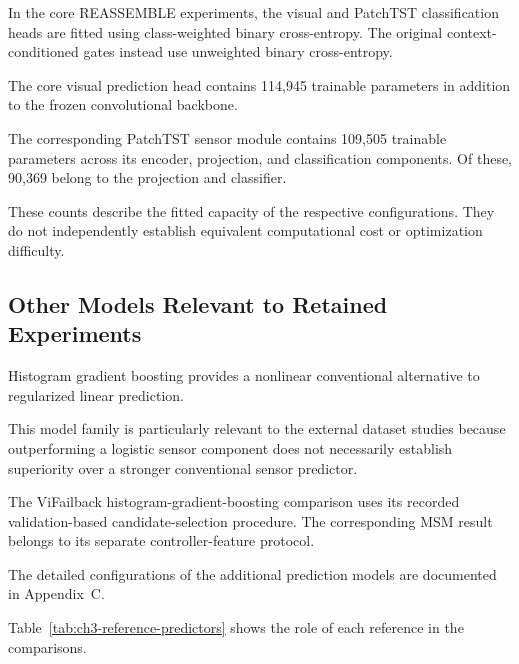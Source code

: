 In the core REASSEMBLE experiments, the visual and PatchTST classification heads are fitted using class-weighted binary cross-entropy. The original context-conditioned gates instead use unweighted binary cross-entropy.

The core visual prediction head contains 114,945 trainable parameters in addition to the frozen convolutional backbone.

The corresponding PatchTST sensor module contains 109,505 trainable parameters across its encoder, projection, and classification components. Of these, 90,369 belong to the projection and classifier.

These counts describe the fitted capacity of the respective configurations. They do not independently establish equivalent computational cost or optimization difficulty.

\subsection{Other Models Relevant to Retained Experiments}

Histogram gradient boosting provides a nonlinear conventional alternative to regularized linear prediction.

This model family is particularly relevant to the external dataset studies because outperforming a logistic sensor component does not necessarily establish superiority over a stronger conventional sensor predictor.

The ViFailback histogram-gradient-boosting comparison uses its recorded validation-based candidate-selection procedure. The corresponding MSM result belongs to its separate controller-feature protocol.

The detailed configurations of the additional prediction models are documented in Appendix~C.

Table~\ref{tab:ch3-reference-predictors} shows the role of each reference in the comparisons.

